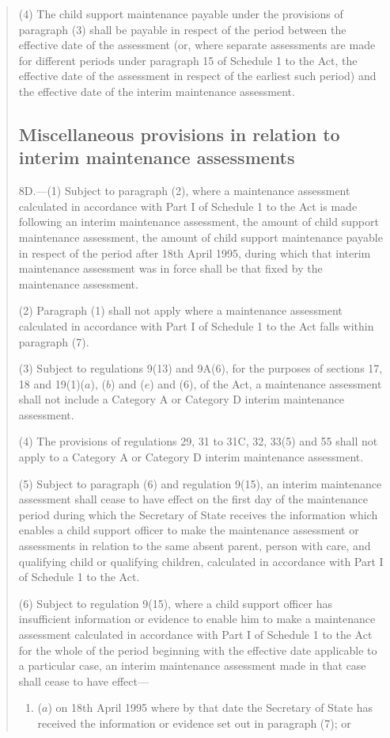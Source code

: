 \documentclass[12pt,a4paper]{article}
\begin{document}
\begin{quotation}
(4) The child support maintenance payable under the provisions of paragraph (3) shall be payable in respect of the period between the effective date of the assessment (or, where separate assessments are made for different periods under paragraph 15 of Schedule 1 to the Act, the effective date of the assessment in respect of the earliest such period) and the effective date of the interim maintenance assessment.

\subsection*{Miscellaneous provisions in relation to interim maintenance assessments}

8D.—(1) Subject to paragraph (2), where a maintenance assessment calculated in accordance with Part I of Schedule 1 to the Act is made following an interim maintenance assessment, the amount of child support maintenance assessment, the amount of child support maintenance payable in respect of the period after 18th April 1995, during which that interim maintenance assessment was in force shall be that fixed by the maintenance assessment.

(2) Paragraph (1) shall not apply where a maintenance assessment calculated in accordance with Part I of Schedule 1 to the Act falls within paragraph (7).

(3) Subject to regulations 9(13) and 9A(6), for the purposes of sections 17, 18 and 19(1)($a$), ($b$) and ($e$) and (6), of the Act, a maintenance assessment shall not include a Category A or Category D interim maintenance assessment.

(4) The provisions of regulations 29, 31 to 31C, 32, 33(5) and 55 shall not apply to a Category A or Category D interim maintenance assessment.

(5) Subject to paragraph (6) and regulation 9(15), an interim maintenance assessment shall cease to have effect on the first day of the maintenance period during which the Secretary of State receives the information which enables a child support officer to make the maintenance assessment or assessments in relation to the same absent parent, person with care, and qualifying child or qualifying children, calculated in accordance with Part I of Schedule 1 to the Act.

(6) Subject to regulation 9(15), where a child support officer has insufficient information or evidence to enable him to make a maintenance assessment calculated in accordance with Part I of Schedule 1 to the Act for the whole of the period beginning with the effective date applicable to a particular case, an interim maintenance assessment made in that case shall cease to have effect—
\begin{enumerate}\item[]
($a$) on 18th April 1995 where by that date the Secretary of State has received the information or evidence set out in paragraph (7); or


\end{enumerate}
\end{quotation}
\end{document}
